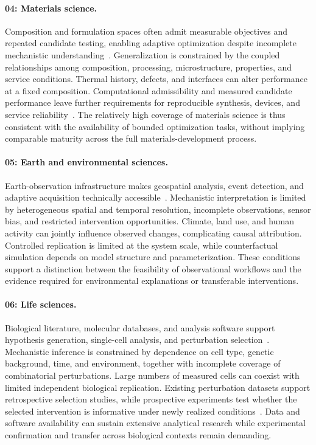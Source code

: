 \paragraph{04: Materials science.}
Composition and formulation spaces often admit measurable objectives and repeated candidate testing, enabling adaptive optimization despite incomplete mechanistic understanding~\cite{burger2020,asd0487}. Generalization is constrained by the coupled relationships among composition, processing, microstructure, properties, and service conditions. Thermal history, defects, and interfaces can alter performance at a fixed composition. Computational admissibility and measured candidate performance leave further requirements for reproducible synthesis, devices, and service reliability~\cite{asd0001,burger2020}. The relatively high coverage of materials science is thus consistent with the availability of bounded optimization tasks, without implying comparable maturity across the full materials-development process.

\paragraph{05: Earth and environmental sciences.}
Earth-observation infrastructure makes geospatial analysis, event detection, and adaptive acquisition technically accessible~\cite{asd0650,asd0722}. Mechanistic interpretation is limited by heterogeneous spatial and temporal resolution, incomplete observations, sensor bias, and restricted intervention opportunities. Climate, land use, and human activity can jointly influence observed changes, complicating causal attribution. Controlled replication is limited at the system scale, while counterfactual simulation depends on model structure and parameterization. These conditions support a distinction between the feasibility of observational workflows and the evidence required for environmental explanations or transferable interventions.

\paragraph{06: Life sciences.}
Biological literature, molecular databases, and analysis software support hypothesis generation, single-cell analysis, and perturbation selection~\cite{asd0138,asd0020}. Mechanistic inference is constrained by dependence on cell type, genetic background, time, and environment, together with incomplete coverage of combinatorial perturbations. Large numbers of measured cells can coexist with limited independent biological replication. Existing perturbation datasets support retrospective selection studies, while prospective experiments test whether the selected intervention is informative under newly realized conditions~\cite{asd0020,king2004}. Data and software availability can sustain extensive analytical research while experimental confirmation and transfer across biological contexts remain demanding.

